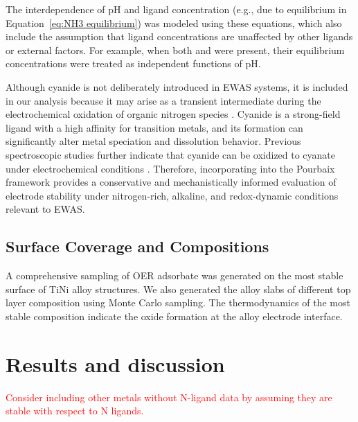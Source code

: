 \documentclass[journal=jacsat,manuscript=article]{achemso}
\begin{document}
The interdependence of pH and ligand concentration (e.g., due to  equilibrium in Equation~\eqref{eq:NH3 equilibrium}) was modeled using these equations, which also include the assumption that ligand concentrations are unaffected by other ligands or external factors. For example, when both  and  were present, their equilibrium concentrations were treated as independent functions of pH.

Although cyanide is not deliberately introduced in EWAS systems, it is included in our analysis because it may arise as a transient intermediate during the electrochemical oxidation of organic nitrogen species \cite{Oraby2020GoldPermanganate, Chen2013AdsorptionStudy, Huerta1997ElectrochemicalPt111, Sandoval2011AdsorptionStudy}. Cyanide is a strong-field ligand with a high affinity for transition metals, and its formation can significantly alter metal speciation and dissolution behavior. Previous spectroscopic studies further indicate that cyanide can be oxidized to cyanate under electrochemical conditions \cite{Paulissen1992InfraredConditions, Hinman1986FourierElectrodes, Kitamura1986OxidationSpectroscopy, Chen2013AdsorptionStudy}. Therefore, incorporating  into the Pourbaix framework provides a conservative and mechanistically informed evaluation of electrode stability under nitrogen-rich, alkaline, and redox-dynamic conditions relevant to EWAS.


\subsection{Surface Coverage and Compositions}

A comprehensive sampling of OER adsorbate was generated on the most stable surface of TiNi alloy structures. We also generated the alloy slabs of different top layer composition using Monte Carlo sampling. The thermodynamics of the most stable composition indicate the oxide formation at the alloy electrode interface. 



\section{Results and discussion}

\textcolor{red}{Consider including other metals without N-ligand data by assuming they are stable with respect to N ligands.}
\end{document}
